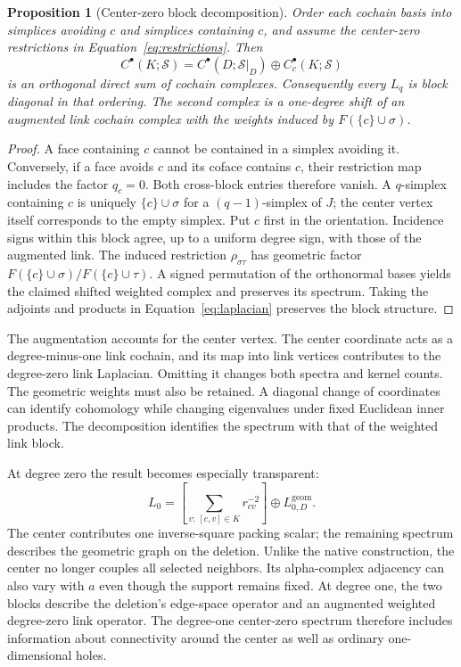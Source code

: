 \documentclass[11pt]{article}
\newtheorem{proposition}{Proposition}
\begin{document}
\begin{proposition}[Center-zero block decomposition]
Order each cochain basis into simplices avoiding $c$ and simplices containing $c$, and assume the center-zero restrictions in Equation~\eqref{eq:restrictions}. Then
\begin{equation}
C^\bullet(K;\mathcal S)=C^\bullet(D;\mathcal S|_D)\oplus C^\bullet_c(K;\mathcal S)
\label{eq:split}
\end{equation}
is an orthogonal direct sum of cochain complexes. Consequently every $L_q$ is block diagonal in that ordering. The second complex is a one-degree shift of an augmented link cochain complex with the weights induced by $F(\{c\}\cup\sigma)$.
\label{prop:split}
\end{proposition}
\begin{proof}
A face containing $c$ cannot be contained in a simplex avoiding it. Conversely, if a face avoids $c$ and its coface contains $c$, their restriction map includes the factor $q_c=0$. Both cross-block entries therefore vanish. A $q$-simplex containing $c$ is uniquely $\{c\}\cup\sigma$ for a $(q-1)$-simplex of $J$; the center vertex itself corresponds to the empty simplex. Put $c$ first in the orientation. Incidence signs within this block agree, up to a uniform degree sign, with those of the augmented link. The induced restriction $\rho_{\sigma\tau}$ has geometric factor $F(\{c\}\cup\sigma)/F(\{c\}\cup\tau)$. A signed permutation of the orthonormal bases yields the claimed shifted weighted complex and preserves its spectrum. Taking the adjoints and products in Equation~\eqref{eq:laplacian} preserves the block structure.
\end{proof}

The augmentation accounts for the center vertex. The center coordinate acts as a degree-minus-one link cochain, and its map into link vertices contributes to the degree-zero link Laplacian. Omitting it changes both spectra and kernel counts. The geometric weights must also be retained. A diagonal change of coordinates can identify cohomology while changing eigenvalues under fixed Euclidean inner products. The decomposition identifies the spectrum with that of the weighted link block.

At degree zero the result becomes especially transparent:
\begin{equation}
L_0=\left[\sum_{v:\,[c,v]\in K}r_{cv}^{-2}\right]\oplus L_{0,D}^{\mathrm{geom}}.
\label{eq:center-zero-degree0}
\end{equation}
The center contributes one inverse-square packing scalar; the remaining spectrum describes the geometric graph on the deletion. Unlike the native construction, the center no longer couples all selected neighbors. Its alpha-complex adjacency can also vary with $a$ even though the support remains fixed. At degree one, the two blocks describe the deletion's edge-space operator and an augmented weighted degree-zero link operator. The degree-one center-zero spectrum therefore includes information about connectivity around the center as well as ordinary one-dimensional holes.
\end{document}
